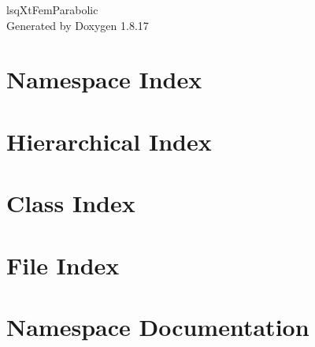 \let\mypdfximage\pdfximage\def\pdfximage{\immediate\mypdfximage}\documentclass[twoside]{book}
\newcommand{\+}{\discretionary{\mbox{\scriptsize$\hookleftarrow$}}{}{}}
\newcommand{\clearemptydoublepage}{%
  \newpage{\pagestyle{empty}\cleardoublepage}%
}
\begin{document}
\hypersetup{pageanchor=false,
             bookmarksnumbered=true,
             pdfencoding=unicode
            }
\begin{titlepage}
\vspace*{7cm}
\begin{center}%
{\Large lsq\+Xt\+Fem\+Parabolic }\\
\vspace*{1cm}
{\large Generated by Doxygen 1.8.17}\\
\end{center}
\end{titlepage}
\clearemptydoublepage
{}
\tableofcontents
\clearemptydoublepage
{}
\hypersetup{pageanchor=true}

\chapter{Namespace Index}

\chapter{Hierarchical Index}

\chapter{Class Index}

\chapter{File Index}

\chapter{Namespace Documentation}


\end{document}
